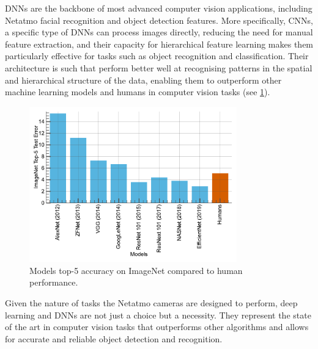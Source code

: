 \acp{DNN} are the backbone of most advanced computer vision applications,
including Netatmo facial recognition and object detection features. More
specifically, \acp{CNN}, a specific type of \acp{DNN} can process images
directly, reducing the need for manual feature extraction, and their capacity
for hierarchical feature learning makes them particularly effective for tasks
such as object recognition and classification. Their architecture is such that
perform better well at recognising patterns in the spatial and hierarchical
structure of the data, enabling them to outperform other machine learning models
and humans in computer vision tasks (see \cref{fig:intro:models_vs_humans}).\\

\begin{figure}[htbp]
    \centering
    \includegraphics[width=0.8\textwidth]{chapter_intro/assets/models_vs_human.pdf}
    \caption{Models top-5 accuracy on ImageNet \cite{deng2009imagenet} compared
        to human performance.}
    \label{fig:intro:models_vs_humans}
\end{figure}

Given the nature of tasks the Netatmo cameras are designed to perform, deep
learning and \aclp{DNN} are not just a choice but a necessity. They represent
the state of the art in computer vision tasks that outperforms other algorithms
and allows for accurate and reliable object detection and recognition.\\



